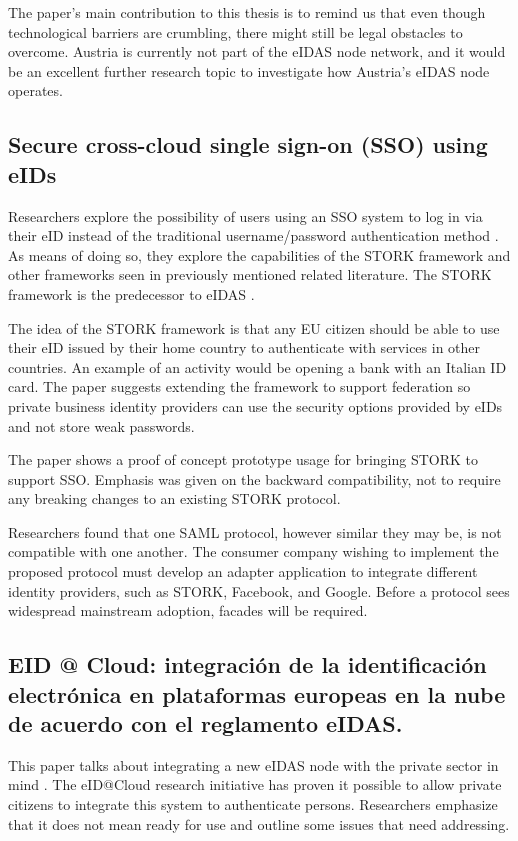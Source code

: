 The paper's main contribution to this thesis is to remind us that even though technological barriers are crumbling, there might still be legal obstacles to overcome. Austria is currently not part of the eIDAS node network, and it would be an excellent further research topic to investigate how Austria's eIDAS node operates.

\subsection{Secure cross-cloud single sign-on (SSO) using eIDs}

Researchers explore the possibility of users using an SSO system to log in via their eID instead of the traditional username/password authentication method \cite{secure-signon}. As means of doing so, they explore the capabilities of the STORK framework and other frameworks seen in previously mentioned related literature. The STORK framework is the predecessor to eIDAS \cite{stork}.

The idea of the STORK framework is that any EU citizen should be able to use their eID issued by their home country to authenticate with services in other countries. An example of an activity would be opening a bank with an Italian ID card. The paper suggests extending the framework to support federation so private business identity providers can use the security options provided by eIDs and not store weak passwords.

The paper shows a proof of concept prototype usage for bringing STORK to support SSO. Emphasis was given on the backward compatibility, not to require any breaking changes to an existing STORK protocol.

Researchers found that one SAML protocol, however similar they may be, is not compatible with one another. The consumer company wishing to implement the proposed protocol must develop an adapter application to integrate different identity providers, such as STORK, Facebook, and Google. Before a protocol sees widespread mainstream adoption, facades will be required.

\subsection{EID @ Cloud: integración de la identificación electrónica en plataformas europeas en la nube de acuerdo con el reglamento eIDAS.}

This paper talks about integrating a new eIDAS node with the private sector in mind \cite{guerola2019eid}. The eID@Cloud research initiative has proven it possible to allow private citizens to integrate this system to authenticate persons. Researchers emphasize that it does not mean ready for use and outline some issues that need addressing.

